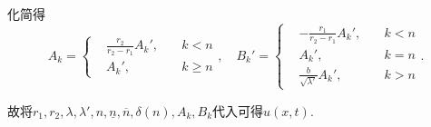 \documentclass[11pt,a4paper]{article}
\begin{document}
化简得
$$A_k=\left\{\begin{aligned}&\frac{r_2}{r_2-r_1}A_k',&\quad k<n\\&A_k',&\quad k\geqslant n\end{aligned}\right.,\quad
B_k'=\left\{\begin{aligned}&-\frac{r_1}{r_2-r_1}A_k',&\quad k<n\\&A_k',&\quad k=n\\&\frac{b}{\sqrt{\lambda'}}A_k',&\quad k>n\end{aligned}\right..$$

故将$r_1,r_2,\lambda,\lambda',n,\underline{n},\overline{n},\delta(n),A_k,B_k$代入可得$u(x,t)$.
\end{document}
